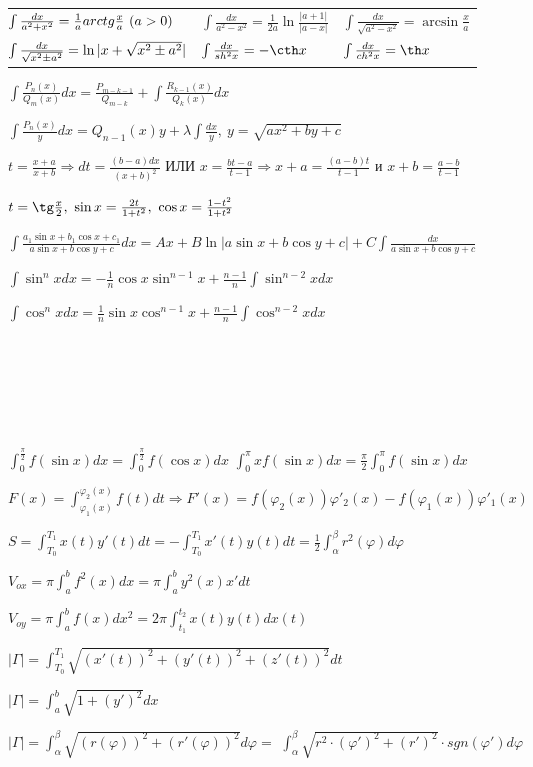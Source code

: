 \documentclass[a4paper, 12pt]{article}
\newcommand\tab[1][.5cm]{\hspace*{#1}}
\theoremstyle{definition}
\begin{document}
    \fontsize{14pt}{20pt}\selectfont
    \begin{tabular}{l l l}
        $\tab[-0.2cm]\int \frac{dx}{a^2 + x^2} = \frac{1}{a}arctg \frac{x}{a}\ (a>0)$ & 
        $\int \frac{dx}{a^2 - x^2} = \frac{1}{2a}\ln \frac{|a + 1|}{|a - x|}$ & 
        $\int \frac{dx}{\sqrt{a^2 - x^2}} = \arcsin \frac{x}{a}$\\
        $\tab[-0.2cm]\int \frac{dx}{\sqrt{x^2 \pm a^2}} = \ln|x + \sqrt{x^2 \pm a^2}|$ & 
        $\int \frac{dx}{sh^2 x} = -\cth x$  &
        $\int \frac{dx}{ch^2 x} = \th x$
    \end{tabular}

    $\int \frac{P_n(x)}{Q_m(x)}dx = \frac{P_{m-k-1}}{Q_{m-k}} + \int \frac{R_{k-1}(x)}{Q_k(x)}dx$

    $\int \frac{P_n(x)}{y}dx = Q_{n-1}(x)y + \lambda\int \frac{dx}{y},\ y = \sqrt{ax^2 + by + c}$

    $t = \frac{x + a}{x + b} \Longrightarrow dt = \frac{(b-a)dx}{(x + b)^2}$ ИЛИ $x = \frac{bt - a}{t - 1} \Longrightarrow x + a = \frac{(a - b)t}{t - 1}$ и $x + b = \frac{a - b}{t - 1} $   
    
    $t = \tg \frac{x}{2},\ \sin x = \frac{2t}{1 + t^2},\ \cos x = \frac{1 - t^2}{1 + t^2}$

    $\int \frac{a_1\sin x + b_1\cos x + c_1}{a\sin x + b\cos y + c}dx = Ax + B\ln|a\sin x + b\cos y + c| + C\int \frac{dx}{a\sin x + b\cos y + c} $

    $\int\sin^nxdx = -\frac{1}{n}\cos x\sin^{n-1} x + 
    \frac{n-1}{n}\int\sin^{n-2}xdx$

    $\int\cos^nxdx = \frac{1}{n}\sin x\cos^{n-1} x + 
    \frac{n-1}{n}\int\cos^{n-2}xdx$ 

    \tab[1cm]\\
    \tab[1cm]\\
    \tab[1cm]\\
    \tab[1cm]\\
    \tab[1cm]\\
    \tab[1cm]

    $\int_{0}^{\frac{\pi}{2}} f(\sin x)dx = \int_{0}^{\frac{\pi}{2}} f(\cos x)dx$\tab[1cm]
    $\int_{0}^{\pi} xf(\sin x)dx = \frac{\pi}{ 2} \int_{0}^{\pi} f(\sin x)dx$

    $F(x) = \int_{\varphi_1(x)}^{\varphi_2(x)} f(t)dt \Longrightarrow F'(x) = f(\varphi_2(x))\varphi'_2(x) - f(\varphi_1(x))\varphi'_1(x)$
    
    $S = \int_{T_0}^{T_1} x(t)y'(t)dt = -\int_{T_0}^{T_1} x'(t)y(t)dt = \frac{1}{2}\int_{\alpha}^{\beta} r^2(\varphi)d \varphi$
    
    $V_{ox} = \pi \int_{a}^{b}f^2(x)dx = \pi \int_{a}^{b} y^2(x)x'dt$ 

    $V_{oy} = \pi \int_{a}^{b} f(x)dx^2 = 2\pi \int_{t_1}^{t_2} x(t)y(t)dx(t)$ 

    $|\Gamma| = \int_{T_0}^{T_1} \sqrt{(x'(t))^2 + (y'(t))^2 + (z'(t))^2}dt$
    
    $|\Gamma| = \int_{a}^{b} \sqrt{1 + (y')^2}dx$
    
    $|\Gamma| = \int_{\alpha}^{\beta} \sqrt{(r(\varphi))^2 + (r'(\varphi))^2}d \varphi =$
    $ \int_{\alpha}^{\beta} \sqrt{r^2\cdot (\varphi')^2 + (r')^2}\cdot sgn(\varphi')d \varphi$ 
    
\end{document}
